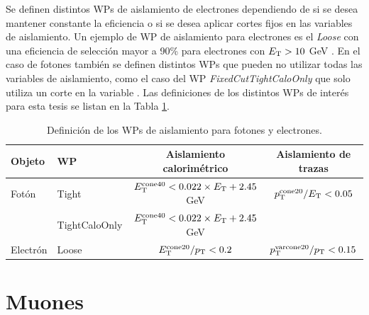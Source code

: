 Se definen distintos WPs de aislamiento de electrones dependiendo de si se desea mantener constante la eficiencia o si se desea aplicar cortes fijos en las variables de aislamiento. Un ejemplo de WP de aislamiento para electrones es el \textit{Loose} con una eficiencia de selección mayor a 90\% para electrones con $E_{\text{T}}>10$ GeV \cite{EGAM-2018-01}. En el caso de fotones también se definen distintos WPs que pueden no utilizar todas las variables de aislamiento, como el caso del WP \textit{FixedCutTightCaloOnly} que solo utiliza un corte en la variable \ETcone. Las definiciones de los distintos WPs de interés para esta tesis se listan en la Tabla \ref{IDWPs}.



\begin{table} 
\centering
\caption{Definición de los WPs de aislamiento para fotones y electrones.}
	\begin{tabular}{ l l c c}

		Objeto & WP & Aislamiento calorimétrico & Aislamiento de trazas \\

		\hline
		\hline

		Fotón & Tight & $E_{\text{T}}^{\text{cone40}} < 0.022\times E_{\text{T}} + 2.45$ GeV & $p_{\text{T}}^{\text{cone20}}/E_{\text{T}}<0.05$ \\

		 & TightCaloOnly & $E_{\text{T}}^{\text{cone40}} < 0.022\times E_{\text{T}} + 2.45$ GeV &  \\

		\hline

		Electrón & Loose & $E_{\text{T}}^{\text{cone20}}/p_{\text{T}}<0.2$ & $p_{\text{T}}^{\text{varcone20}}/p_{\text{T}}<0.15$\\

	\end{tabular}
\label{IDWPs}
\end{table}








\section{Muones}


